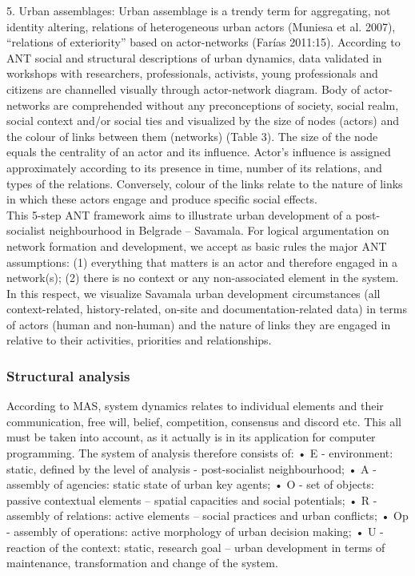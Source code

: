 \documentclass[11pt]{report}
\begin{document}
5.	Urban assemblages: Urban assemblage is a trendy term for aggregating, not identity altering, relations of heterogeneous urban actors (Muniesa et al. 2007), “relations of exteriority” based on actor-networks (Farías 2011:15).
According to ANT social and structural descriptions of urban dynamics, data validated in workshops with researchers, professionals, activists, young professionals and citizens are channelled visually through actor-network diagram. Body of actor-networks are comprehended without any preconceptions of society, social realm, social context and/or social ties and visualized by the size of nodes (actors) and the colour of links between them (networks) (Table 3). The size of the node equals the centrality of an actor and its influence. Actor’s influence is assigned approximately according to its presence in time, number of its relations, and types of the relations. Conversely, colour of the links relate to the nature of links in which these actors engage and produce specific social effects.
\\
This 5-step ANT framework aims to illustrate urban development of a post-socialist neighbourhood in Belgrade – Savamala. For logical argumentation on network formation and development, we accept as basic rules the major ANT assumptions: (1) everything that matters is an actor and therefore engaged in a network(s); (2) there is no context or any non-associated element in the system. In this respect, we visualize Savamala urban development circumstances (all context-related, history-related, on-site and documentation-related data) in terms of actors (human and non-human) and the nature of links they are engaged in relative to their activities, priorities and relationships.

\subsubsection{Structural analysis}

According to MAS, system dynamics relates to individual elements and their communication, free will, belief, competition, consensus and discord etc. This all must be taken into account, as it actually is in its application for computer programming. The system of analysis therefore consists of:
•	E - environment: static, defined by the level of analysis - post-socialist neighbourhood;
•	A - assembly of agencies: static state of urban key agents;
•	O - set of objects: passive contextual elements – spatial capacities and social potentials;
•	R - assembly of relations: active elements – social practices and urban conflicts;
•	Op - assembly of operations: active morphology of urban decision making;
•	U - reaction of the context: static, research goal – urban development in terms of maintenance, transformation and change of the system.
\end{document}
